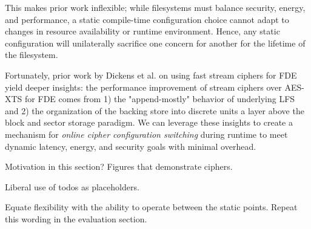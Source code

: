 This makes prior work inflexible; while filesystems must balance security,
energy, and performance, a static compile-time configuration choice cannot adapt
to changes in resource availability or runtime environment. Hence, any static
configuration will unilaterally sacrifice one concern for another for the
lifetime of the filesystem.

Fortunately, prior work by Dickens et al. on using fast stream ciphers for FDE
yield deeper insights: the performance improvement of stream ciphers over
AES-XTS for FDE comes from 1) the "append-mostly" behavior of underlying LFS and
2) the organization of the backing store into discrete units a layer above the
block and sector storage paradigm. We can leverage these insights to create a
mechanism for \emph{online cipher configuration switching} during runtime to
meet dynamic latency, energy, and security goals with minimal overhead.





Motivation in this section? Figures that demonstrate ciphers.



Liberal use of todos as placeholders.



Equate flexibility with the ability to operate between the static points. Repeat this wording in the evaluation section.
